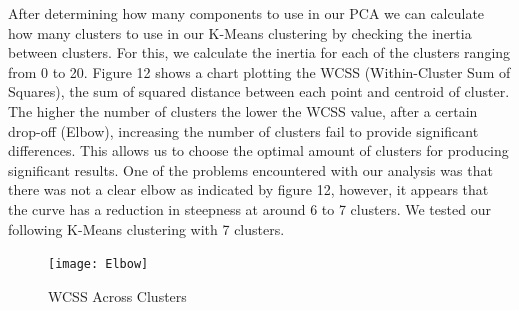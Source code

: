 \documentclass[11pt, a4paper, twocolumn]{article}
\begin{document}
After determining how many components to use in our PCA we can calculate how many clusters to use in our K-Means clustering by checking the inertia between clusters. For this, we calculate the inertia for each of the clusters ranging from 0 to 20. Figure 12 shows a chart plotting the WCSS (Within-Cluster Sum of Squares), the sum of squared distance between each point and centroid of cluster. The higher the number of clusters the lower the WCSS value, after a certain drop-off (Elbow), increasing the number of clusters fail to provide significant differences. This allows us to choose the optimal amount of clusters for producing significant results. One of the problems encountered with our analysis was that there was not a clear elbow as indicated by figure 12, however, it appears that the curve has a reduction in steepness at around 6 to 7 clusters. We tested our following K-Means clustering with 7 clusters.
\begin{figure}[htb!]
\centerline{\texttt{[image: Elbow]}}
\caption{WCSS Across Clusters}
\end{figure}
\end{document}
